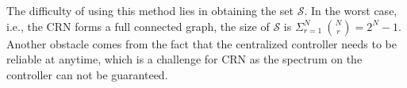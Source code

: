 \documentclass[times]{ettauth}
\newcommand{\ie}{i.e., }
\theoremstyle{mytheoremstyle}
\theoremstyle{mytheoremstyle}
\theoremstyle{mytheoremstyle}
\begin{document}






The difficulty of using this method lies in obtaining the set $\mathcal{S}$.
In the worst case, \ie the CRN forms a full connected graph, the size of $\mathcal{S}$ is $\Sigma_{r=1}^{N}\ {N \choose r} = 2^N-1$.
Another obstacle comes from the fact that the centralized controller needs to be reliable at anytime, which is a challenge for CRN as the spectrum on the controller can not be guaranteed.
\end{document}
